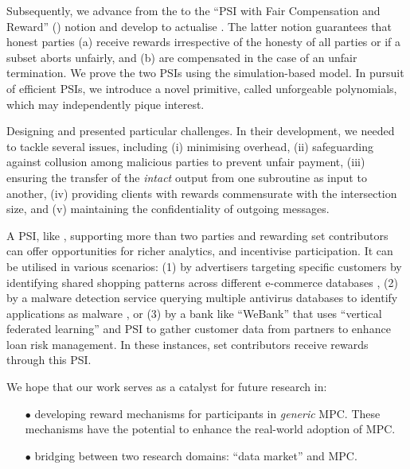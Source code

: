 Subsequently, we advance from the \p to the ``PSI with Fair Compensation and Reward'' (\ep) notion and develop \withRew to actualise \ep. The latter notion guarantees that honest parties (a) receive rewards irrespective of the honesty of all parties or if a subset aborts unfairly, and (b) are compensated in the case of an unfair termination. We prove the two PSIs using the simulation-based model. In pursuit of efficient PSIs, we introduce a novel primitive, called unforgeable polynomials, which may independently pique interest. 


Designing \withFai and \withRew presented particular challenges. In their development, we needed to tackle several issues, including (i) minimising overhead, (ii) safeguarding against collusion among malicious parties to prevent unfair payment, (iii) ensuring the transfer of the \textit{intact} output from one subroutine as input to another, (iv) providing clients with rewards commensurate with the intersection size, and (v) maintaining the confidentiality of outgoing messages.






A PSI, like \withRew, supporting more than two parties and rewarding set contributors can offer opportunities for richer analytics, and incentivise participation.  It can be utilised in various scenarios: (1) by advertisers targeting specific customers by identifying shared shopping patterns across different e-commerce databases \cite{IonKNPSS0SY20}, (2) by a malware detection service querying multiple antivirus databases to identify applications as malware \cite{TamrakarLPEPA17}, or (3) by a bank like ``WeBank'' \cite{ChengLCY20}  that uses  ``vertical federated learning''   and PSI to gather customer data from partners to enhance loan risk management. In these instances, set contributors receive rewards through this PSI. 

We hope that our work serves as a catalyst for future research in:


\vspace{-3mm}
 \begin{itemize}
 
 \item[$\bullet$] developing reward mechanisms for participants in \textit{generic} MPC. These mechanisms have the potential to enhance the real-world adoption of MPC. 

\item[$\bullet$] bridging between two research domains: ``data market'' \cite{golob2023decentralized,KochKMMR22,abs-2210-08723} and MPC. 

\end{itemize}


